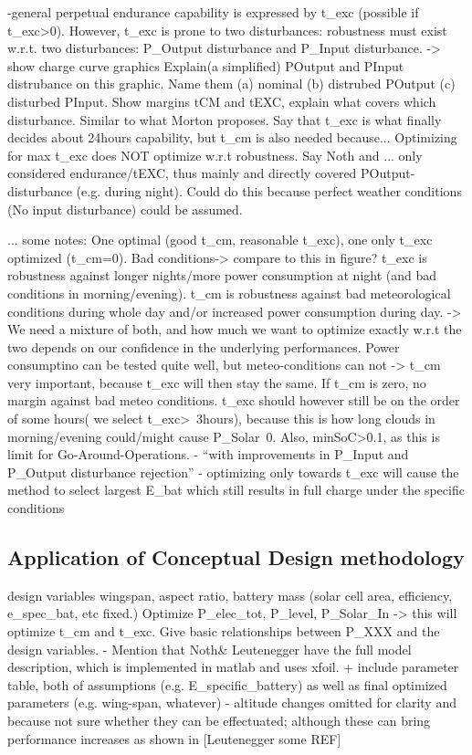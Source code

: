 \documentclass[letterpaper, 10 pt, conference]{ieeeconf}  %
\begin{document}
 -general perpetual endurance capability is expressed by t\_exc (possible if t\_exc>0). However, t\_exc is prone to two disturbances:
 robustness must exist w.r.t. two disturbances: P\_Output disturbance and P\_Input disturbance.
 -> show charge curve graphics
 Explain(a simplified) POutput and PInput distrubance on this graphic. Name them (a) nominal (b) distrubed POutput (c) disturbed PInput.
 Show margins tCM and tEXC, explain what covers which disturbance. Similar to what Morton proposes. Say that t\_exc is what finally decides about 24hours capability, but t\_cm is also needed because... Optimizing for max t\_exc does NOT optimize w.r.t robustness.
 Say Noth and ... only considered endurance/tEXC, thus mainly and directly covered POutput-disturbance (e.g. during night). Could do this because perfect weather conditions (No input disturbance) could be assumed.
 
 ... some notes:
 One optimal (good t\_cm, reasonable t\_exc), one only t\_exc optimized (t\_cm=0). Bad conditions-> compare to this in figure?
 t\_exc is robustness against longer nights/more power consumption at night (and bad conditions in morning/evening). t\_cm is robustness against bad meteorological conditions during whole day and/or increased power consumption during day. -> We need a mixture of both, and how much we want to optimize exactly w.r.t the two depends on our confidence in the underlying performances. Power consumptino can be tested quite well, but meteo-conditions can not -> t\_cm very important, because t\_exc will then stay the same. If t\_cm is zero, no margin against bad meteo conditions. t\_exc should however still be on the order of some hours( we select t\_exc>~3hours), because this is how long clouds in morning/evening could/might cause P\_Solar~0. Also, minSoC>0.1, as this is limit for Go-Around-Operations.
 - ``with improvements in P\_Input and P\_Output disturbance rejection''
 - optimizing only towards t\_exc will cause the method to select largest E\_bat which still results in full charge under the specific conditions
 
 \subsection{Application of Conceptual Design methodology}
 design variables wingspan, aspect ratio, battery mass (solar cell area, efficiency, e\_spec\_bat, etc fixed.)
 Optimize P\_elec\_tot, P\_level, P\_Solar\_In -> this will optimize t\_cm and t\_exc. Give basic relationships between P\_XXX and the design variables. 
  - Mention that Noth\& Leutenegger have the full model description, which is implemented in matlab and uses xfoil.
    + include parameter table, both of assumptions (e.g. E\_specific\_battery) as well as final optimized parameters (e.g. wing-span, whatever)
     - altitude changes omitted for clarity and because not sure whether they can be effectuated; although these can bring performance increases as shown in [Leutenegger some REF]
 
\end{document}
